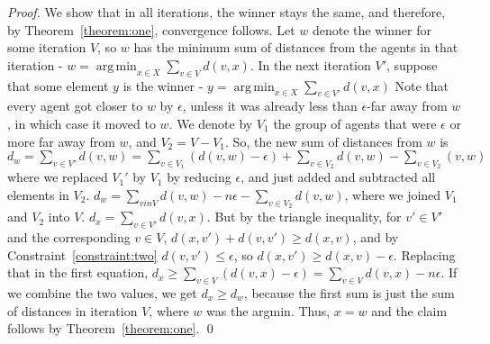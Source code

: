 \documentclass[runningheads,envcountsame]{llncs}
\DeclareMathOperator*{\argmin}{arg\,min}
\begin{document}
\begin{proof}
%
We show that in all iterations, the winner stays the same, and therefore, by Theorem~\ref{theorem:one}, convergence follows.
Let $w$ denote the winner for some iteration $V$, so $w$ has the minimum sum of distances from the agents in that iteration - $w=\argmin_{x \in X} \sum_{v \in V} d(v, x)$. In the next iteration $V'$, suppose that some element $y$ is the winner - $y=\argmin_{x \in X} \sum_{v \in V'} d(v, x)$
%
Note that every agent got closer to $w$ by $\epsilon$, unless it was already less than $\epsilon$-far away from $w$, in which case it moved to $w$. We denote by $V_1$
the group of agents that were $\epsilon$ or more far away from $w$, and $V_2=V-V_1$. So, the new sum of distances from $w$ is $d_w=\sum_{v \in V'} d(v, w) = \sum_{v \in V_1}(d(v, w) - \epsilon) + \sum_{v \in V_2} d(v, w) - \sum_{v \in V_2} (v, w)$ where we replaced $V_1'$ by $V_1$ by reducing $\epsilon$, and just added and subtracted all elements in $V_2$. $d_w = \sum_{v in V} d(v, w) - n\epsilon - \sum_{v \in V_2} d(v, w)$, where we joined $V_1$ and $V_2$ into $V$.
$d_x=\sum_{v \in V'} d(v, x)$. But by the triangle inequality, for $v' \in V'$ and the corresponding $v \in V$, $d(x, v') + d(v, v') \geq d(x, v)$, and by Constraint~\ref{constraint:two} $d(v, v') \leq \epsilon$, so $d(x, v') \geq d(x, v) - \epsilon$.
Replacing that in the first equation, $d_x \geq \sum_{v \in V} (d(v, x) - \epsilon)=\sum_{v \in V} d(v, x) - n\epsilon$.
If we combine the two values, we get $d_x\geq d_w$, because the first sum is just the sum of distances in iteration $V$, where $w$ was the argmin. Thus, $x = w$ and the claim follows by Theorem~\ref{theorem:one}.
\qed\end{proof}
\end{document}
